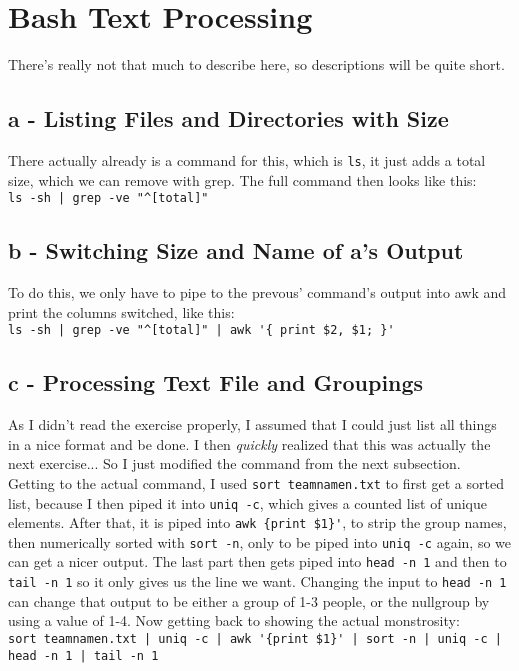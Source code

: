 \documentclass[a4paper, 11pt]{article}
\begin{document}
    \section{Bash Text Processing}
    There's really not that much to describe here, so descriptions will be quite short.
    
    \subsection{a - Listing Files and Directories with Size}
    There actually already is a command for this, which is \texttt{ls}, it just adds a total size, which we can 
    remove with grep. The full command then looks like this:\\ 
    \lstinline{ls -sh | grep -ve "^[total]"}

    \subsection{b - Switching Size and Name of a's Output}
    To do this, we only have to pipe to the prevous' command's output into awk and print the columns switched, 
    like this:\\
    \lstinline+ls -sh | grep -ve "^[total]" | awk '{ print $2, $1; }'+

    \subsection{c - Processing Text File and Groupings}
    As I didn't read the exercise properly, I assumed that I could just list all things in a nice format and be done.
    I then \textit{quickly} realized that this was actually the next exercise... So I just modified the command from the next subsection.
    Getting to the actual command, I used \lstinline{sort teamnamen.txt} to first get a sorted list, because I then piped it 
    into \lstinline{uniq -c}, which gives a counted list of unique elements. After that, it is piped into \lstinline+awk {print $1}'+, 
    to strip the group names, then numerically sorted with \lstinline{sort -n}, only to be piped into \lstinline{uniq -c} again, so we can get a nicer output.
    The last part then gets piped into \lstinline{head -n 1} and then to \lstinline{tail -n 1} so it only gives us the line we want. Changing the input to 
    \lstinline{head -n 1} can change that output to be either a group of 1-3 people, or the nullgroup by using a value of 1-4. 
    Now getting back to showing the actual monstrosity:\\
    \lstinline+sort teamnamen.txt | uniq -c | awk '{print $1}' | sort -n | uniq -c | head -n 1 | tail -n 1+ 
\end{document}
